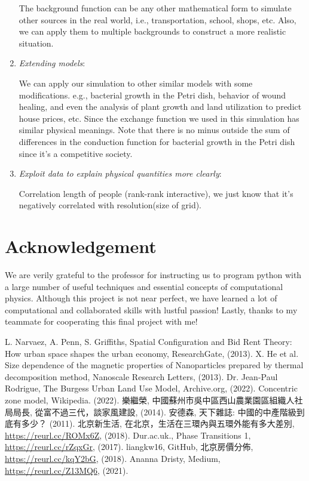 \documentclass[10pt]{article}
\begin{document}
\begin{multicols}{2}
\begin{enumerate}
            The background function can be any other mathematical form to simulate other sources in the real world, i.e., transportation, school, shops, etc. Also, we can apply them to multiple backgrounds to construct a more realistic situation.

            \item \emph{Extending models}:

            We can apply our simulation to other similar models with some modifications. e.g., bacterial growth in the Petri dish, behavior of wound healing, and even the analysis of plant growth and land utilization to predict house prices, etc. Since the exchange function we used in this simulation has similar physical meanings. Note that there is no minus outside the sum of differences in the conduction function for bacterial growth in the Petri dish since it's a competitive society.

            \item \emph{Exploit data to explain physical quantities more clearly}:

            Correlation length of people (rank-rank interactive), we just know that it's negatively correlated with resolution(size of grid).
 
        \end{enumerate}

\section{Acknowledgement}
    We are verily grateful to the professor for instructing us to program python with a large number of useful techniques and essential concepts of computational physics. Although this project is not near perfect, we have learned a lot of computational and collaborated skills with lustful passion! Lastly, thanks to my teammate for cooperating this final project with me!

\begin{thebibliography}{1}

     L. Narvaez, A. Penn, S. Griffiths, Spatial Configuration and Bid Rent Theory: How urban space shapes the urban economy, ResearchGate, (2013). 
    X. He et al. Size dependence of the magnetic properties of Nanoparticles prepared by thermal decomposition method, Nanoscale Research Letters, (2013).
     Dr. Jean-Paul Rodrigue, The Burgess Urban Land Use Model, Archive.org, (2022).
     Concentric zone model, Wikipedia. (2022). 
    樂繼榮, 中國蘇州市吳中區西山農業園區組織人社局局長, 從富不過三代，談家風建設, (2014).
    安德森, 天下雜誌: 中國的中產階級到底有多少？ (2011).
    北京新生活, 在北京，生活在三環內與五環外能有多大差別, \url{https://reurl.cc/ROMx6Z}, (2018).
    Dur.ac.uk., Phase Transitions 1, \url{https://reurl.cc/rZqxGr}, (2017).
     liangkw16, GitHub, 北京房價分佈, \url{https://reurl.cc/kqY2bG},  (2018).
      Ananna Dristy, Medium, \url{https://reurl.cc/Z13MQ6}, (2021).
    

\end{thebibliography}
\end{multicols}
\end{document}
